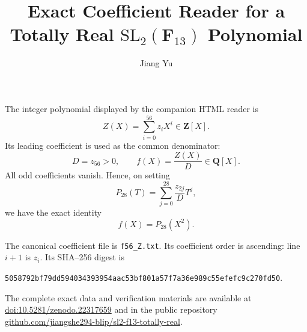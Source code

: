 \documentclass[11pt]{article}
\title{Exact Coefficient Reader for a Totally Real
  $\mathrm{SL}_2(\mathbf F_{13})$ Polynomial}
\author{Jiang Yu}
\date{}
\begin{document}
\maketitle

The integer polynomial displayed by the companion HTML reader is
\begin{equation}
  Z(X)=\sum_{i=0}^{56} z_iX^i\in\mathbf Z[X].
\end{equation}
Its leading coefficient is used as the common denominator:
\begin{equation}
  D=z_{56}>0,
  \qquad
  f(X)=\frac{Z(X)}{D}\in\mathbf Q[X].
\end{equation}
All odd coefficients vanish.  Hence, on setting
\begin{equation}
  P_{28}(T)=\sum_{j=0}^{28}\frac{z_{2j}}{D}T^j,
\end{equation}
we have the exact identity
\begin{equation}
  f(X)=P_{28}(X^2).
\end{equation}

The canonical coefficient file is \texttt{f56\_Z.txt}.  Its coefficient
order is ascending: line $i+1$ is $z_i$.  Its SHA--256 digest is
\begin{center}
\texttt{5058792bf79dd594034393954aac53bf801a57f7a36e989c55efefc9c270fd50}.
\end{center}

The complete exact data and verification materials are available at
\href{https://doi.org/10.5281/zenodo.22317659}{doi:10.5281/zenodo.22317659}
and in the public repository
\href{https://github.com/jiangshe294-blip/sl2-f13-totally-real}
{github.com/jiangshe294-blip/sl2-f13-totally-real}.
\end{document}
